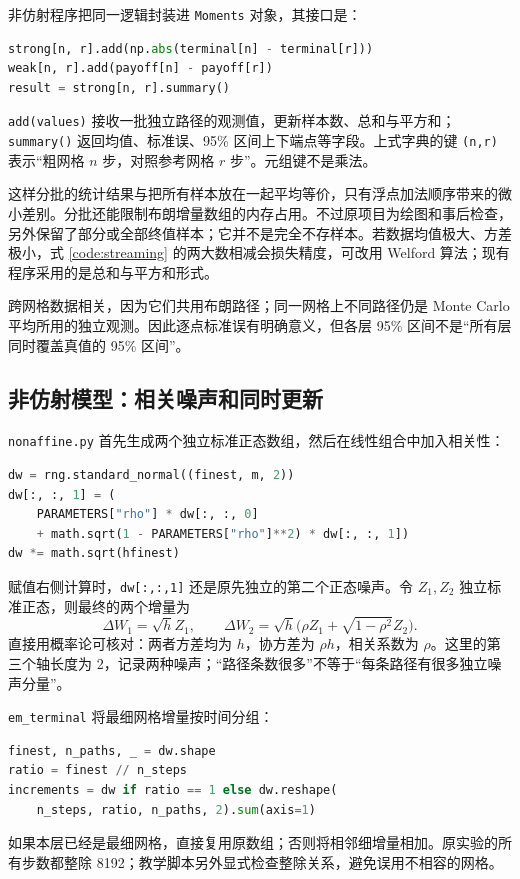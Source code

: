 \documentclass[11pt,a4paper,fontset=none]{ctexart}
\numberwithin{equation}{section}
\begin{document}
非仿射程序把同一逻辑封装进 \texttt{Moments} 对象，其接口是：
\begin{lstlisting}[language=Python]
strong[n, r].add(np.abs(terminal[n] - terminal[r]))
weak[n, r].add(payoff[n] - payoff[r])
result = strong[n, r].summary()
\end{lstlisting}
\texttt{add(values)} 接收一批独立路径的观测值，更新样本数、总和与平方和；\texttt{summary()} 返回均值、标准误、95\% 区间上下端点等字段。上式字典的键 \texttt{(n,r)} 表示“粗网格 $n$ 步，对照参考网格 $r$ 步”。元组键不是乘法。

这样分批的统计结果与把所有样本放在一起平均等价，只有浮点加法顺序带来的微小差别。分批还能限制布朗增量数组的内存占用。不过原项目为绘图和事后检查，另外保留了部分或全部终值样本；它并不是完全不存样本。若数据均值极大、方差极小，式 \eqref{code:streaming} 的两大数相减会损失精度，可改用 Welford 算法；现有程序采用的是总和与平方和形式。

跨网格数据相关，因为它们共用布朗路径；同一网格上不同路径仍是 Monte Carlo 平均所用的独立观测。因此逐点标准误有明确意义，但各层 95\% 区间不是“所有层同时覆盖真值的 95\% 区间”。

\subsection{非仿射模型：相关噪声和同时更新}

\texttt{nonaffine.py} 首先生成两个独立标准正态数组，然后在线性组合中加入相关性：
\begin{lstlisting}[language=Python]
dw = rng.standard_normal((finest, m, 2))
dw[:, :, 1] = (
    PARAMETERS["rho"] * dw[:, :, 0]
    + math.sqrt(1 - PARAMETERS["rho"]**2) * dw[:, :, 1])
dw *= math.sqrt(hfinest)
\end{lstlisting}
赋值右侧计算时，\texttt{dw[:,:,1]} 还是原先独立的第二个正态噪声。令 $Z_1,Z_2$ 独立标准正态，则最终的两个增量为
\[
\Delta W_1=\sqrt h Z_1,\qquad
\Delta W_2=\sqrt h\bigl(\rho Z_1+\sqrt{1-\rho^2}Z_2\bigr).
\]
直接用概率论可核对：两者方差均为 $h$，协方差为 $\rho h$，相关系数为 $\rho$。这里的第三个轴长度为 2，记录两种噪声；“路径条数很多”不等于“每条路径有很多独立噪声分量”。

\texttt{em\_terminal} 将最细网格增量按时间分组：
\begin{lstlisting}[language=Python]
finest, n_paths, _ = dw.shape
ratio = finest // n_steps
increments = dw if ratio == 1 else dw.reshape(
    n_steps, ratio, n_paths, 2).sum(axis=1)
\end{lstlisting}
如果本层已经是最细网格，直接复用原数组；否则将相邻细增量相加。原实验的所有步数都整除 8192；教学脚本另外显式检查整除关系，避免误用不相容的网格。
\end{document}
